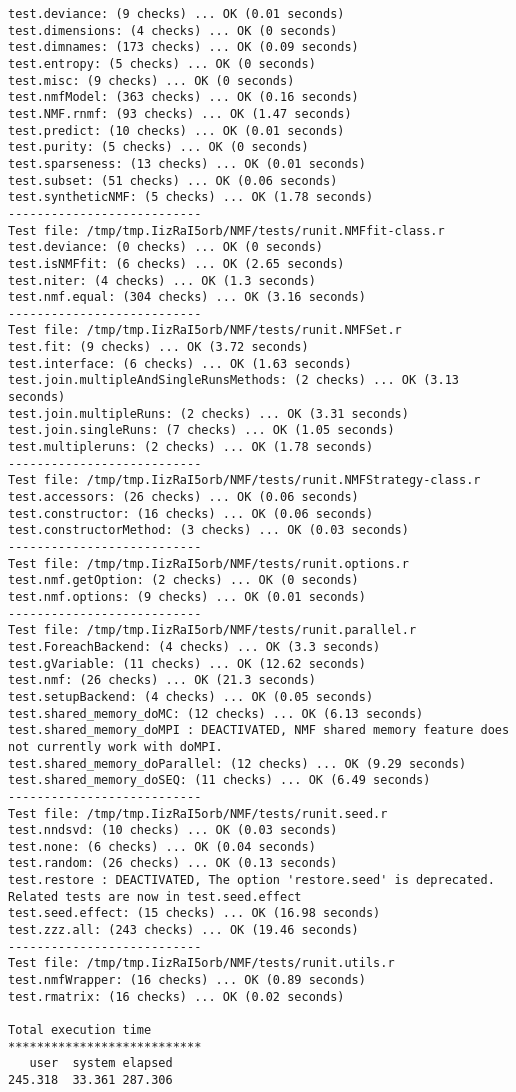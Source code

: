 \documentclass[10pt]{article}
\begin{document}
\begin{verbatim}
test.deviance: (9 checks) ... OK (0.01 seconds)
test.dimensions: (4 checks) ... OK (0 seconds)
test.dimnames: (173 checks) ... OK (0.09 seconds)
test.entropy: (5 checks) ... OK (0 seconds)
test.misc: (9 checks) ... OK (0 seconds)
test.nmfModel: (363 checks) ... OK (0.16 seconds)
test.NMF.rnmf: (93 checks) ... OK (1.47 seconds)
test.predict: (10 checks) ... OK (0.01 seconds)
test.purity: (5 checks) ... OK (0 seconds)
test.sparseness: (13 checks) ... OK (0.01 seconds)
test.subset: (51 checks) ... OK (0.06 seconds)
test.syntheticNMF: (5 checks) ... OK (1.78 seconds)
--------------------------- 
Test file: /tmp/tmp.IizRaI5orb/NMF/tests/runit.NMFfit-class.r 
test.deviance: (0 checks) ... OK (0 seconds)
test.isNMFfit: (6 checks) ... OK (2.65 seconds)
test.niter: (4 checks) ... OK (1.3 seconds)
test.nmf.equal: (304 checks) ... OK (3.16 seconds)
--------------------------- 
Test file: /tmp/tmp.IizRaI5orb/NMF/tests/runit.NMFSet.r 
test.fit: (9 checks) ... OK (3.72 seconds)
test.interface: (6 checks) ... OK (1.63 seconds)
test.join.multipleAndSingleRunsMethods: (2 checks) ... OK (3.13 seconds)
test.join.multipleRuns: (2 checks) ... OK (3.31 seconds)
test.join.singleRuns: (7 checks) ... OK (1.05 seconds)
test.multipleruns: (2 checks) ... OK (1.78 seconds)
--------------------------- 
Test file: /tmp/tmp.IizRaI5orb/NMF/tests/runit.NMFStrategy-class.r 
test.accessors: (26 checks) ... OK (0.06 seconds)
test.constructor: (16 checks) ... OK (0.06 seconds)
test.constructorMethod: (3 checks) ... OK (0.03 seconds)
--------------------------- 
Test file: /tmp/tmp.IizRaI5orb/NMF/tests/runit.options.r 
test.nmf.getOption: (2 checks) ... OK (0 seconds)
test.nmf.options: (9 checks) ... OK (0.01 seconds)
--------------------------- 
Test file: /tmp/tmp.IizRaI5orb/NMF/tests/runit.parallel.r 
test.ForeachBackend: (4 checks) ... OK (3.3 seconds)
test.gVariable: (11 checks) ... OK (12.62 seconds)
test.nmf: (26 checks) ... OK (21.3 seconds)
test.setupBackend: (4 checks) ... OK (0.05 seconds)
test.shared_memory_doMC: (12 checks) ... OK (6.13 seconds)
test.shared_memory_doMPI : DEACTIVATED, NMF shared memory feature does not currently work with doMPI.
test.shared_memory_doParallel: (12 checks) ... OK (9.29 seconds)
test.shared_memory_doSEQ: (11 checks) ... OK (6.49 seconds)
--------------------------- 
Test file: /tmp/tmp.IizRaI5orb/NMF/tests/runit.seed.r 
test.nndsvd: (10 checks) ... OK (0.03 seconds)
test.none: (6 checks) ... OK (0.04 seconds)
test.random: (26 checks) ... OK (0.13 seconds)
test.restore : DEACTIVATED, The option 'restore.seed' is deprecated. Related tests are now in test.seed.effect
test.seed.effect: (15 checks) ... OK (16.98 seconds)
test.zzz.all: (243 checks) ... OK (19.46 seconds)
--------------------------- 
Test file: /tmp/tmp.IizRaI5orb/NMF/tests/runit.utils.r 
test.nmfWrapper: (16 checks) ... OK (0.89 seconds)
test.rmatrix: (16 checks) ... OK (0.02 seconds)

Total execution time
***************************
   user  system elapsed 
245.318  33.361 287.306 

\end{verbatim}
\end{document}
